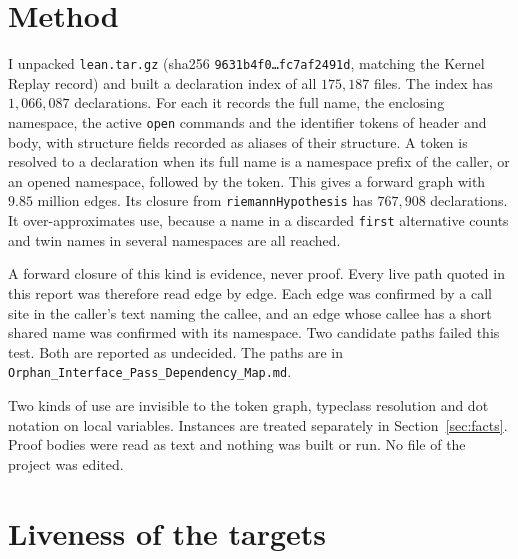 \documentclass[11pt]{article}
\newcommand{\lean}[1]{\nolinkurl{#1}}
\newcommand{\Lpath}[1]{\nolinkurl{#1}}
\theoremstyle{remark}
\begin{document}
\section{Method}\label{sec:method}

I unpacked \Lpath{lean.tar.gz} (sha256 \texttt{9631b4f0\dots fc7af2491d}, matching the Kernel Replay record) and built a declaration index of all $175{,}187$ files. The index has $1{,}066{,}087$ declarations. For each it records the full name, the enclosing namespace, the active \lean{open} commands and the identifier tokens of header and body, with structure fields recorded as aliases of their structure. A token is resolved to a declaration when its full name is a namespace prefix of the caller, or an opened namespace, followed by the token. This gives a forward graph with $9.85$ million edges. Its closure from \lean{riemannHypothesis} has $767{,}908$ declarations. It over-approximates use, because a name in a discarded \lean{first} alternative counts and twin names in several namespaces are all reached.

A forward closure of this kind is evidence, never proof. Every live path quoted in this report was therefore read edge by edge. Each edge was confirmed by a call site in the caller's text naming the callee, and an edge whose callee has a short shared name was confirmed with its namespace. Two candidate paths failed this test. Both are reported as undecided. The paths are in \Lpath{Orphan_Interface_Pass_Dependency_Map.md}.

Two kinds of use are invisible to the token graph, typeclass resolution and dot notation on local variables. Instances are treated separately in Section~\ref{sec:facts}. Proof bodies were read as text and nothing was built or run. No file of the project was edited.

\section{Liveness of the targets}
\end{document}
